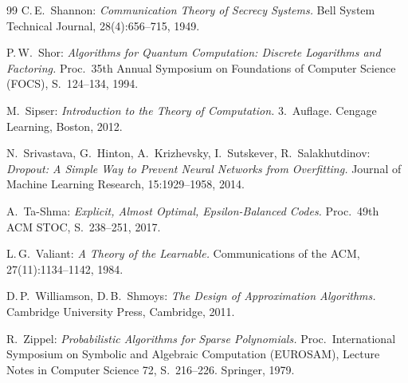 ﻿\documentclass[12pt,a4paper]{article}
\theoremstyle{definition}
\theoremstyle{plain}
\theoremstyle{remark}
\begin{document}
\begin{thebibliography}{99}
C.\,E.\ Shannon:
\textit{Communication Theory of Secrecy Systems.}
Bell System Technical Journal, 28(4):656--715, 1949.

P.\,W.\ Shor:
\textit{Algorithms for Quantum Computation: Discrete Logarithms and Factoring.}
Proc.\ 35th Annual Symposium on Foundations of Computer Science (FOCS),
S.~124--134, 1994.

M.\ Sipser:
\textit{Introduction to the Theory of Computation.}
3.~Auflage.
Cengage Learning, Boston, 2012.

N.\ Srivastava, G.\ Hinton, A.\ Krizhevsky, I.\ Sutskever, R.\ Salakhutdinov:
\textit{Dropout: A Simple Way to Prevent Neural Networks from Overfitting.}
Journal of Machine Learning Research, 15:1929--1958, 2014.

A.\ Ta-Shma:
\textit{Explicit, Almost Optimal, Epsilon-Balanced Codes.}
Proc.\ 49th ACM STOC, S.~238--251, 2017.

L.\,G.\ Valiant:
\textit{A Theory of the Learnable.}
Communications of the ACM, 27(11):1134--1142, 1984.

D.\,P.\ Williamson, D.\,B.\ Shmoys:
\textit{The Design of Approximation Algorithms.}
Cambridge University Press, Cambridge, 2011.

R.\ Zippel:
\textit{Probabilistic Algorithms for Sparse Polynomials.}
Proc.\ International Symposium on Symbolic and Algebraic Computation (EUROSAM),
Lecture Notes in Computer Science 72, S.~216--226. Springer, 1979.

\end{thebibliography}
\end{document}
